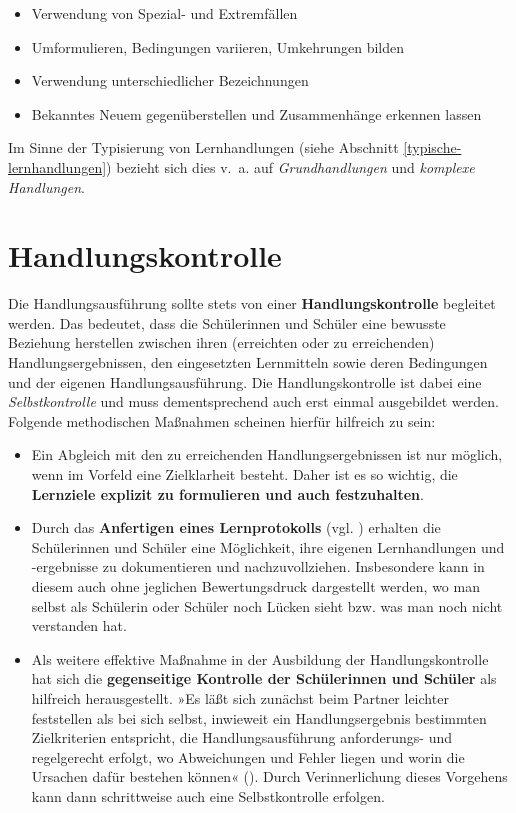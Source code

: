 \documentclass[
]{scrbook}
\providecommand{\tightlist}{%
  \setlength{\itemsep}{0pt}\setlength{\parskip}{0pt}}
\theoremstyle{definition}
\theoremstyle{definition}
\theoremstyle{definition}
\theoremstyle{definition}
\theoremstyle{remark}
\begin{document}
\begin{itemize}
\tightlist
\item
  Verwendung von Spezial- und Extremfällen\\
\item
  Umformulieren, Bedingungen variieren, Umkehrungen bilden\\
\item
  Verwendung unterschiedlicher Bezeichnungen\\
\item
  Bekanntes Neuem gegenüberstellen und Zusammenhänge erkennen lassen
\end{itemize}

Im Sinne der Typisierung von Lernhandlungen (siehe Abschnitt \ref{typische-lernhandlungen}) bezieht sich dies v.~a. auf \emph{Grundhandlungen} und \emph{komplexe Handlungen}.

\section{Handlungskontrolle}\label{handlungskontrolle}

Die Handlungsausführung sollte stets von einer \textbf{Handlungskontrolle} begleitet werden. Das bedeutet, dass die Schülerinnen und Schüler eine bewusste Beziehung herstellen zwischen ihren (erreichten oder zu erreichenden) Handlungsergebnissen, den eingesetzten Lernmitteln sowie deren Bedingungen und der eigenen Handlungsausführung.
Die Handlungskontrolle ist dabei eine \emph{Selbstkontrolle} und muss dementsprechend auch erst einmal ausgebildet werden. Folgende methodischen Maßnahmen scheinen hierfür hilfreich zu sein:

\begin{itemize}
\item
  Ein Abgleich mit den zu erreichenden Handlungsergebnissen ist nur möglich, wenn im Vorfeld eine Zielklarheit besteht. Daher ist es so wichtig, die \textbf{Lernziele explizit zu formulieren und auch festzuhalten}.
\item
  Durch das \textbf{Anfertigen eines Lernprotokolls} (vgl. ) erhalten die Schülerinnen und Schüler eine Möglichkeit, ihre eigenen Lernhandlungen und -ergebnisse zu dokumentieren und nachzuvollziehen. Insbesondere kann in diesem auch ohne jeglichen Bewertungsdruck dargestellt werden, wo man selbst als Schülerin oder Schüler noch Lücken sieht bzw. was man noch nicht verstanden hat.
\item
  Als weitere effektive Maßnahme in der Ausbildung der Handlungskontrolle hat sich die \textbf{gegenseitige Kontrolle der Schülerinnen und Schüler} als hilfreich herausgestellt. »Es läßt sich zunächst beim Partner leichter feststellen als bei sich selbst, inwieweit ein Handlungsergebnis bestimmten Zielkriterien entspricht, die Handlungsausführung anforderungs- und regelgerecht erfolgt, wo Abweichungen und Fehler liegen und worin die Ursachen dafür bestehen können« (). Durch Verinnerlichung dieses Vorgehens kann dann schrittweise auch eine Selbstkontrolle erfolgen.
\end{itemize}
\end{document}

